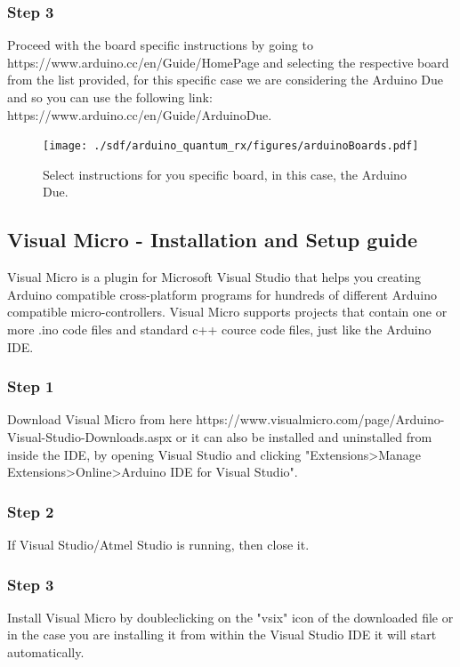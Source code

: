 \begin{refsection}
	\subsubsection{Step 3}
	
	Proceed with the board specific instructions by going to https://www.arduino.cc/en/Guide/HomePage and selecting the respective board from the list provided, for this specific case we are considering the Arduino Due and so you can use the following link: https://www.arduino.cc/en/Guide/ArduinoDue.
	
	\begin{figure}[H]
		\centering
		\texttt{[image: ./sdf/arduino\_quantum\_rx/figures/arduinoBoards.pdf]}
		\caption{Select instructions for you specific board, in this case, the Arduino Due.}
		\label{arduinoDownload}
	\end{figure}
	
	\subsection{Visual Micro - Installation and Setup guide}
	Visual Micro is a plugin for Microsoft Visual Studio that helps you creating Arduino compatible cross-platform programs for hundreds of different Arduino compatible micro-controllers. Visual Micro supports projects that contain one or more .ino code files and standard c++ cource code files, just like the Arduino IDE.
	
	
	\subsubsection{Step 1}
	Download Visual Micro from here https://www.visualmicro.com/page/Arduino-Visual-Studio-Downloads.aspx or it can also be installed and uninstalled from inside the IDE, by opening Visual Studio and clicking "Extensions>Manage Extensions>Online>Arduino IDE for Visual Studio".
	
	\subsubsection{Step 2}
	If Visual Studio/Atmel Studio is running, then close it.
	
	\subsubsection{Step 3}
	Install Visual Micro by doubleclicking on the "vsix" icon of the downloaded file or in the case you are installing it from within the Visual Studio IDE it will start automatically.
	

\end{refsection}
